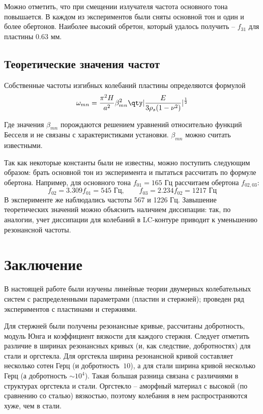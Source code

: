 \documentclass[a4paper,14pt]{extarticle}
\begin{document}
Можно отметить, что при смещении излучателя частота основного тона повышается. В каждом из экспериментов были сняты основной тон и один и более обертонов. Наиболее высокий обретон, который удалось получить -- $f_{31}$ для пластины 0.63 мм.

\subsection{Теоретические значения частот}
Собственные частоты изгибных колебаний пластины определяются формулой
\begin{equation}
	\omega_{mn} = \frac{\pi^2 H}{a^2}\beta_{mn}^2 \qty|\frac{E}{3\rho_s (1-\nu^2)}|^{\frac12}
\end{equation}

Где значения $\beta_{mn}$ порождаются решением уравнений относительно функций Бесселя и не связаны с характеристиками установки. $\beta_{mn}$ можно считать известными.

Так как некоторые константы были не известны, можно поступить следующим образом: брать основной тон из эксперимента и пытаться рассчитать по формуле обертона. Например, для основного тона $f_{01}=165$ Гц рассчитаем обертона $f_{02,03}$:
\begin{equation}
	f_{02} = 3.309 f_{01} = 545 \text{ Гц},\qquad 
	f_{03} = 2.234 f_{02} = 1217 \text{ Гц} 
\end{equation}
В эксперименте же наблюдались частоты 567 и 1226 Гц. Завышение теоретических значений можно объяснить наличием диссипации: так, по аналогии, учет диссипации для колебаний в LC-контуре приводит к уменьшению резонансной частоты.
\newpage
{}
\section*{Заключение}
В настоящей работе были изучены линейные теории двумерных колебательных систем с распределенными параметрами (пластин и стержней); проведен ряд экспериментов с пластинами и стержнями. 

Для стержней были получены резонансные кривые, рассчитаны добротность, модуль Юнга и коэффициент вязкости для каждого стержня. Следует отметить различие в ширинах резонансных кривых (и, как следствие, добротностях) для стали и оргстекла. Для оргстекла ширина резонансной кривой составляет несколько сотен Герц (и добротность $~10$), а для стали ширина кривой несколько Герц (а добротность $\sim 10^4$). Такая большая разница связана с различиями в структурах оргстекла и стали. Оргстекло -- аморфный материал с высокой (по сравнению со сталью) вязкостью, поэтому колебания в нем распространяются хуже, чем в стали. 
\end{document}
